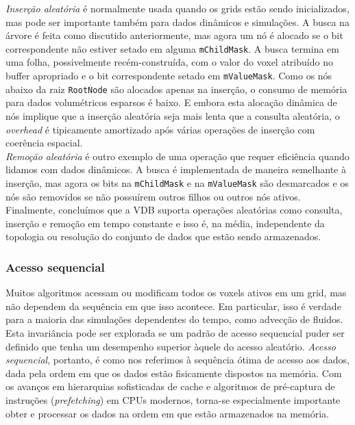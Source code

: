 \emph{Inserção aleatória} é normalmente usada quando os grids estão sendo inicializados, mas pode ser importante também para dados dinâmicos e simulações. A busca na árvore é feita como discutido anteriormente, mas agora um nó é alocado se o bit correspondente não estiver setado em alguma \texttt{mChildMask}. A busca termina em uma folha, possivelmente recém-construída, com o valor do voxel atribuído no buffer apropriado e o bit correspondente setado em \texttt{mValueMask}. Como os nós abaixo da raiz \texttt{RootNode} são alocados apenas na inserção, o consumo de memória para dados volumétricos esparsos é baixo. E embora esta alocação dinâmica de nós implique que a inserção aleatória seja mais lenta que a consulta aleatória, o {\it overhead} é tipicamente amortizado após várias operações de inserção com coerência espacial. \\

\emph{Remoção aleatória} é outro exemplo de uma operação que requer eficiência quando lidamos com dados dinâmicos. A busca é implementada de maneira semelhante à inserção, mas agora os bits na \texttt{mChildMask} e na \texttt{mValueMask} são desmarcados e os nós são removidos se não possuírem outros filhos ou outros nós ativos. \\

Finalmente, concluímos que a VDB suporta operações aleatórias como consulta, inserção e remoção em tempo constante e isso é, na média, independente da topologia ou resolução do conjunto de dados que estão sendo armazenados.
 
\subsubsection{Acesso sequencial}
Muitos algoritmos acessam ou modificam todos os voxels ativos em um grid, mas não dependem da sequência em que isso acontece. Em particular, isso é verdade para a maioria das simulações dependentes do tempo, como advecção de fluidos. Esta invariância pode ser explorada se um padrão de acesso sequencial puder ser definido que tenha um desempenho superior àquele do acesso aleatório. \emph{Acesso sequencial}, portanto, é como nos referimos à sequência ótima de acesso aos dados, dada pela ordem em que os dados estão fisicamente dispostos na memória. Com os avanços em hierarquias sofisticadas de cache e algoritmos de pré-captura de instruções ({\it prefetching}) em CPUs modernos, torna-se especialmente importante obter e processar os dados na ordem em que estão armazenados na memória. \\

